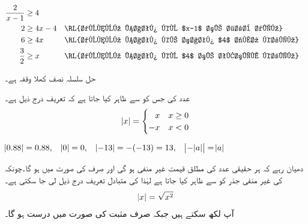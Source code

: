 \begin{enumerate}[1)]
\begin{align*}
\frac{2}{x-1}&\ge 4\\
2&\ge 4x-4&&\text{\RL{دونوں ہاتھ کو $x-1$ سے ضرب دیں}}\\
6&\ge 4x&&\text{\RL{دونوں ہاتھ کے ساتھ $4$ جمع کریں}}\\
\frac{3}{2}&\ge x&&\text{\RL{دونوں ہاتھ کو $4$ سے تقسیم کریں}}
\end{align*}
%
\begin{center}
\end{center}
حل سلسلہ نصف کھلا وقفہ \عددی{(1,\tfrac{3}{2}]} ہے۔
\end{enumerate}
عدد  کی  جس کو  سے ظاہر کیا جاتا ہے کہ تعریف درج ذیل ہے۔
\begin{align*}
\abs{x}=
\begin{cases}
\phantom{-}x&x\ge 0\\
-x&x<0
\end{cases}
\end{align*}

$\abs{0.88}=0.88,\quad \abs{0}=0,\quad \abs{-13}=-(-13)=13,\quad \abs{-\abs{a}}=\abs{a}$

دھیان رہے کہ ہر حقیقی عدد کی مطلق قیمت غیر منفی  ہو گی اور صرف  کی صورت میں  ہو گا۔چونکہ  کی غیر منفی  جذر کو  سے ظاہر کیا جاتا ہے لہٰذا  کی متبادل تعریف درج ذیل لی جا سکتی ہے۔
\begin{align*}
\abs{x}=\sqrt{x^2}
\end{align*} 
آپ  لکھ سکتے ہیں جبکہ  صرف مثبت  کی صورت میں درست ہو گا۔ 

